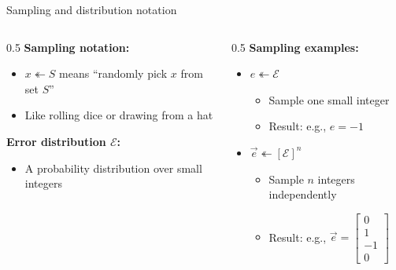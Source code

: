 \ifdefined\PRESENTATION\else\PassOptionsToClass{handout}{beamer}\fi\documentclass[aspectratio=169, lualatex]{beamer}
\begin{document}
\begin{frame}{Sampling and distribution notation}
	\begin{columns}[c]
		\begin{column}{0.5\textwidth}
			\textbf{Sampling notation:}
			\begin{itemize}
				\item $x \twoheadleftarrow S$ means ``randomly pick $x$ from set $S$''
				\item Like rolling dice or drawing from a hat
			\end{itemize}
			\textbf{Error distribution $\mathcal{E}$:}
			\begin{itemize}
				\item A probability distribution over small integers
			\end{itemize}
		\end{column}
		\begin{column}{0.5\textwidth}
			\textbf{Sampling examples:}
			\begin{itemize}
				\item $e \twoheadleftarrow \mathcal{E}$
				      \begin{itemize}
					      \item Sample one small integer
					      \item Result: e.g., $e = -1$
				      \end{itemize}
				\item $\vec{e} \twoheadleftarrow [\mathcal{E}]^n$
				      \begin{itemize}
					      \item Sample $n$ integers independently
					      \item Result: e.g., $\vec{e} = \begin{bmatrix} 0 \\ 1 \\ -1 \\ 0 \end{bmatrix}$
				      \end{itemize}
			\end{itemize}
		\end{column}
	\end{columns}
\end{frame}
\end{document}

